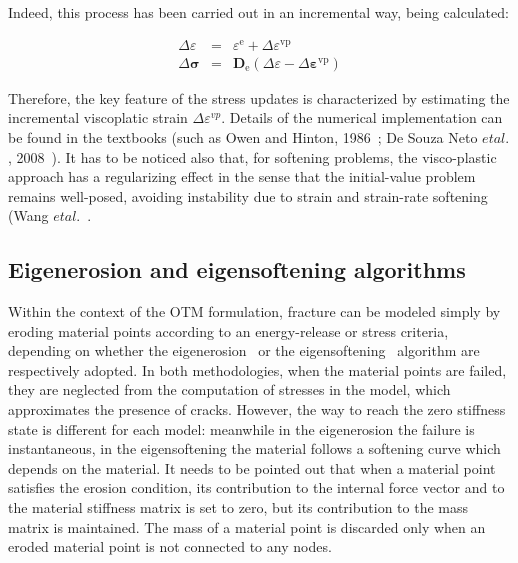 \documentclass[applsci,journal,article,submit,moreauthors,pdftex]{Definitions/mdpi}
\begin{document}
Indeed, this process has been carried out in an incremental way, being calculated:

\begin{eqnarray}
\Delta \varepsilon &=& \varepsilon^{\mathrm{e}}+\Delta \varepsilon^{\mathrm{vp}} \\
\Delta \boldsymbol{\sigma} &=& \mathbf{D}_{\mathrm{e}}\left(\Delta \varepsilon-\Delta \boldsymbol{\varepsilon}^{\mathrm{vp}}\right)
\end{eqnarray}


Therefore, the key feature of the stress updates is characterized by estimating the incremental viscoplatic strain $\Delta \varepsilon^{v p}.$ Details of the numerical implementation can be found in the textbooks (such as Owen and Hinton, 1986~\cite{Owen1981}; De Souza Neto $et al.$, 2008~\cite{DPOwen2005}). It has to be noticed also that, for softening problems, the visco-plastic approach has a regularizing effect in the sense that the initial-value problem remains well-posed, avoiding instability due to strain and strain-rate softening (Wang $et al.$~\cite{Wang:1997}.


\subsection{Eigenerosion and eigensoftening algorithms}

Within the context of the OTM formulation, fracture can be modeled simply by eroding material points according to an energy-release or stress criteria, depending on whether the eigenerosion~\cite{schmidt09, Pandolfi_12, Li_12, Pandolfi_13} or the eigensoftening~\cite{Navas2018a,Yu2018,Molinos2020b} algorithm are respectively adopted. In both methodologies, when the material points are failed, they are neglected from the computation of stresses in the model, which approximates the presence of cracks. However, the way to reach the zero stiffness state is different for each model: meanwhile in the eigenerosion the failure is instantaneous, in the eigensoftening the material follows a softening curve which depends on the material. It needs to be pointed out that when a material point satisfies the erosion condition, its contribution to the internal force vector and to the material stiffness matrix is set to zero, but its contribution to the mass matrix is maintained. The mass of a material point is discarded only when an eroded material point is not connected to any nodes.
\end{document}
